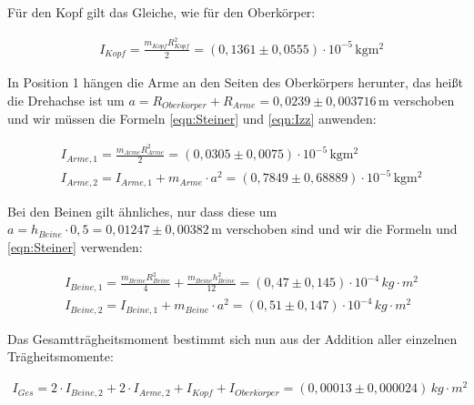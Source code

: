 Für den Kopf gilt das Gleiche, wie für den Oberkörper:

\begin{align*}
  & I_{Kopf} = \frac{m_{Kopf}R_{Kopf}^2}{2} = (0{,}1361 \pm 0{,}0555) \cdot 10^{-5} \, \mathrm{kgm^2}
\end{align*}

In Position 1 hängen die Arme an den Seiten des Oberkörpers herunter, das heißt die Drehachse ist um $a = R_{Oberk\ddot{o}rper} + R_{Arme} = 0{,}0239 \pm 0{,}003716 \, \mathrm{m}$
verschoben und wir müssen die Formeln \ref{eqn:Steiner} und \ref{eqn:Izz} anwenden:

\begin{align*}
  & I_{Arme,1} = \frac{m_{Arme}R_{Arme}^2}{2} = (0{,}0305 \pm 0{,}0075) \cdot 10^{-5} \, \mathrm{kgm^2} \\
  & I_{Arme,2} = I_{Arme,1} + m_{Arme} \cdot a^2 = (0{,}7849 \pm 0{,}68889) \cdot 10^{-5} \, \mathrm{kgm^2}
\end{align*}

Bei den Beinen gilt ähnliches, nur dass diese um $a = h_{Beine} \cdot 0{,}5 = 0{,}01247 \pm 0{,}00382 \, \mathrm{m}$ verschoben sind
und wir die Formeln \label{eqn:Izx} und \ref{eqn:Steiner} verwenden:

\begin{align*}
  & I_{Beine,1} = \frac{m_{Beine}R_{Beine}^2}{4} + \frac{m_{Beine}h_{Beine}^2}{12} = (0,47 \pm 0,145) \cdot 10^{-4} \, kg \cdot m^2 \\
  & I_{Beine,2} = I_{Beine,1} + m_{Beine} \cdot a^2 = (0,51 \pm 0,147) \cdot 10^{-4} \, kg \cdot m^2
\end{align*}

Das Gesamtträgheitsmoment bestimmt sich nun aus der Addition aller einzelnen Trägheitsmomente:

\begin{align}
  I_{Ges} = 2 \cdot I_{Beine,2} + 2 \cdot I_{Arme,2} + I_{Kopf} + I_{Oberk\ddot{o}rper} = (0,00013 \pm 0,000024) \, kg \cdot m^2
\end{align}

